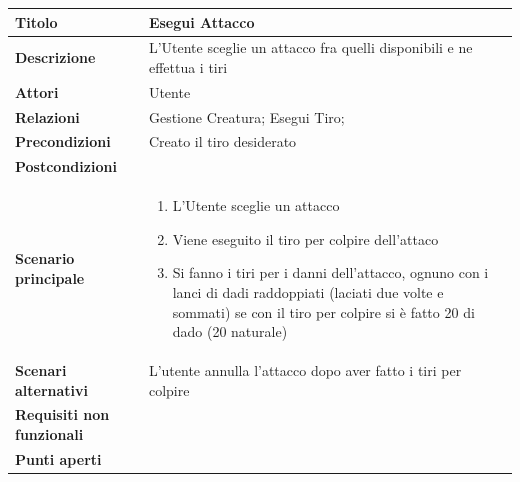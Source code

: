 \documentclass[a4paper, 11pt]{article}
\begin{document}
\begin{center}
\begin{tabular}{ |p{5cm}|p{9.5cm}|  }
\hline
\textbf{Titolo} & Esegui Attacco \\
\hline
\textbf{Descrizione} & L'Utente sceglie un attacco fra quelli disponibili e ne effettua i tiri \\
\hline
\textbf{Attori} & Utente \\
\hline
\textbf{Relazioni} & Gestione Creatura; Esegui Tiro; \\
\hline
\textbf{Precondizioni} & Creato il tiro desiderato \\
\hline
\textbf{Postcondizioni} & \\
\hline
\textbf{Scenario principale} & 
\begin{enumerate}
    \item L'Utente sceglie un attacco
    \item Viene eseguito il tiro per colpire dell'attaco
    \item Si fanno i tiri per i danni dell'attacco, ognuno con i lanci di dadi raddoppiati (laciati due volte e sommati) se con il tiro per colpire si è fatto 20 di dado (20 naturale)
\end{enumerate}\\
\hline
\textbf{Scenari alternativi} & L'utente annulla l'attacco dopo aver fatto i tiri per colpire \\
\hline
\textbf{Requisiti non funzionali} & \\
\hline
\textbf{Punti aperti} & \\
\hline
\end{tabular}

\vspace{3em}


\end{center}
\end{document}

